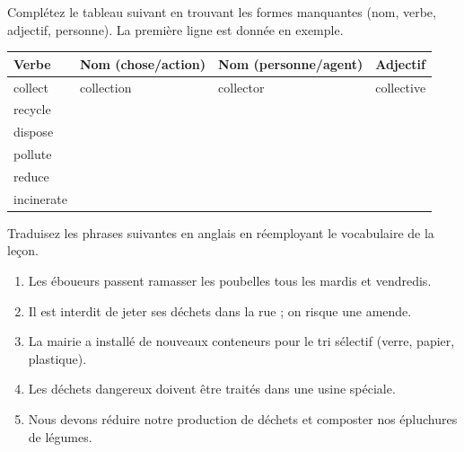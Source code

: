 \documentclass[11pt]{article}
\newcounter{popsec}
\newcounter{popsub}
\newcommand{\courssub}[1]{%
  \stepcounter{popsub}%
  \par\vspace{9pt}\noindent{\popxbold\fontsize{11.5}{13}\selectfont\color{popink}{\color{poporange}\thepopsec.\thepopsub}\hspace{6pt}#1}\par\nopagebreak\vspace{4pt}
}
\begin{document}
\begin{exercice}
Complétez le tableau suivant en trouvant les formes manquantes (nom, verbe, adjectif, personne). La première ligne est donnée en exemple.

\begin{center}
\begin{tabularx}{\linewidth}{|X|X|X|X|}
\hline
\rowcolor{popblueL} \textbf{Verbe} & \textbf{Nom (chose/action)} & \textbf{Nom (personne/agent)} & \textbf{Adjectif} \\
\hline
collect & collection & collector & collective \\
\hline
recycle & & & \\
\hline
dispose & & & \\
\hline
pollute & & & \\
\hline
reduce & & & \\
\hline
incinerate & & & \\
\hline
\end{tabularx}
\end{center}
\end{exercice}

\courssub{Je m'entraîne}

\begin{exercice}
Traduisez les phrases suivantes en anglais en réemployant le vocabulaire de la leçon.
\begin{enumerate}
\item Les éboueurs passent ramasser les poubelles tous les mardis et vendredis.
\item Il est interdit de jeter ses déchets dans la rue ; on risque une amende.
\item La mairie a installé de nouveaux conteneurs pour le tri sélectif (verre, papier, plastique).
\item Les déchets dangereux doivent être traités dans une usine spéciale.
\item Nous devons réduire notre production de déchets et composter nos épluchures de légumes.
\end{enumerate}
\end{exercice}
\end{document}
